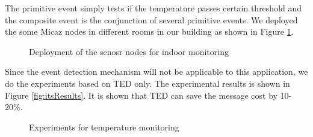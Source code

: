 The primitive event simply tests if the temperature passes certain threshold and the composite event is the conjunction of several primitive events. We deployed the some Micaz nodes in different rooms in our building as shown in Figure \ref{fig:indoorDeployment}.

\begin{figure}
\centering
{}
\caption{Deployment of the senosr nodes for indoor monitoring}
\label{fig:indoorDeployment}
\end{figure}

Since the event detection mechanism will not be applicable to this application, we do the experiments based on TED only. The experimental results is shown in Figure \ref{fig:itsResults}. It is shown that TED can save the message cost by 10-20\%.

\begin{figure}
\centering
{}
\qquad
{}
\caption{Experiments for temperature monitoring}
\label{fig:indoorResult}
\end{figure}